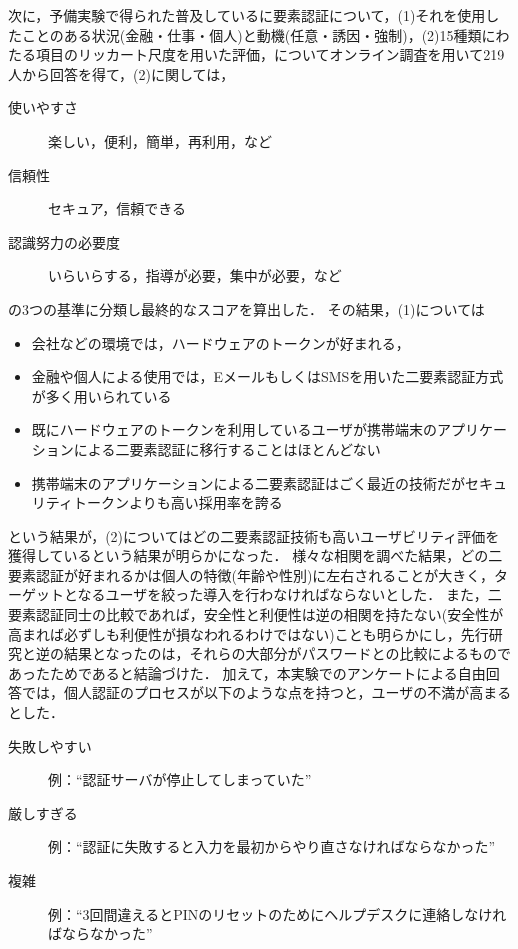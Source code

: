 次に，予備実験で得られた普及しているに要素認証について，(1)それを使用したことのある状況(金融・仕事・個人)と動機(任意・誘因・強制)，(2)15種類にわたる項目のリッカート尺度を用いた評価，についてオンライン調査を用いて219人から回答を得て，(2)に関しては，
\begin{description}
  \item[使いやすさ] 楽しい，便利，簡単，再利用，など
  \item[信頼性] セキュア，信頼できる
  \item[認識努力の必要度] いらいらする，指導が必要，集中が必要，など
\end{description}
の3つの基準に分類し最終的なスコアを算出した．
その結果，(1)については
\begin{itemize}
  \item 会社などの環境では，ハードウェアのトークンが好まれる，
  \item 金融や個人による使用では，EメールもしくはSMSを用いた二要素認証方式が多く用いられている
  \item 既にハードウェアのトークンを利用しているユーザが携帯端末のアプリケーションによる二要素認証に移行することはほとんどない
  \item 携帯端末のアプリケーションによる二要素認証はごく最近の技術だがセキュリティトークンよりも高い採用率を誇る
\end{itemize}
という結果が，(2)についてはどの二要素認証技術も高いユーザビリティ評価を獲得しているという結果が明らかになった．
様々な相関を調べた結果，どの二要素認証が好まれるかは個人の特徴(年齢や性別)に左右されることが大きく，ターゲットとなるユーザを絞った導入を行わなければならないとした．
また，二要素認証同士の比較であれば，安全性と利便性は逆の相関を持たない(安全性が高まれば必ずしも利便性が損なわれるわけではない)ことも明らかにし，先行研究と逆の結果となったのは，それらの大部分がパスワードとの比較によるものであったためであると結論づけた．
加えて，本実験でのアンケートによる自由回答では，個人認証のプロセスが以下のような点を持つと，ユーザの不満が高まるとした．
\begin{description}
  \item[失敗しやすい] 例：``認証サーバが停止してしまっていた''
  \item[厳しすぎる] 例：``認証に失敗すると入力を最初からやり直さなければならなかった''
  \item[複雑] 例：``3回間違えるとPINのリセットのためにヘルプデスクに連絡しなければならなかった''
\end{description}

